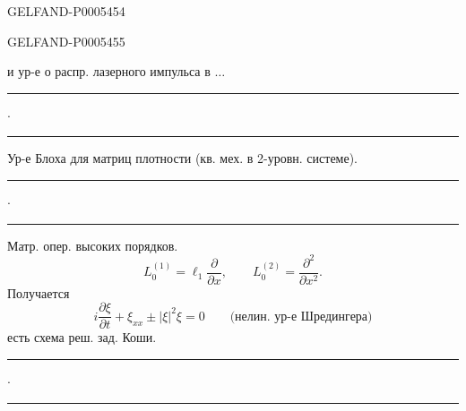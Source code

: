 \begin{GelfandAdjacentEvidence}{GELFAND-P000545}{4}

\end{GelfandAdjacentEvidence}
\begin{GelfandAdjacentEvidence}{GELFAND-P000545}{5}

и ур-е о распр. лазерного импульса в \(\ldots\)
\end{GelfandAdjacentEvidence}

\hfill\rule{1.1cm}{.35pt}\enspace\(\cdot\)\enspace\rule{1.4cm}{.35pt}\par

Ур-е Блоха для матриц плотности (кв. мех. в 2-уровн. системе).
\hfill\rule{1.1cm}{.35pt}\enspace\(\cdot\)\enspace\rule{1.4cm}{.35pt}\par

Матр. опер. высоких порядков.
\[
L_0^{(1)}=\ell_1\frac{\partial}{\partial x},\qquad
L_0^{(2)}=\frac{\partial^2}{\partial x^2}.
\]
Получается
\[
i\frac{\partial\xi}{\partial t}+\xi_{xx}\pm|\xi|^2\xi=0
\qquad\text{(нелин. ур-е Шредингера)}
\]
есть схема реш. зад. Коши.
\hfill\rule{1.4cm}{.35pt}\enspace\(\cdot\)\enspace\rule{1.3cm}{.35pt}\par


